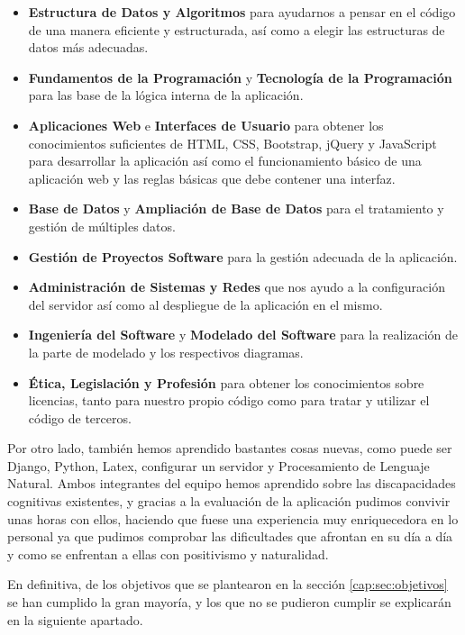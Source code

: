  	\begin{itemize}
 		\item \textbf{Estructura de Datos y Algoritmos }para ayudarnos a pensar en el código de una manera eficiente y estructurada, así como a elegir las estructuras de datos más adecuadas.
 		\item \textbf{Fundamentos de la Programación} y \textbf{Tecnología de la Programación} para las base de la lógica interna de la aplicación.
 		\item \textbf{Aplicaciones Web} e \textbf{Interfaces de Usuario} para obtener los conocimientos suficientes de HTML, CSS, Bootstrap, jQuery y JavaScript para desarrollar la aplicación así como el funcionamiento básico de una aplicación web y las reglas básicas que debe contener una interfaz.
 		\item \textbf{Base de Datos} y \textbf{Ampliación de Base de Datos} para el tratamiento y gestión de múltiples datos.
 		\item \textbf{Gestión de Proyectos Software} para la gestión adecuada de la aplicación.
 		\item \textbf{Administración de Sistemas y Redes} que nos ayudo a la configuración del servidor así como al despliegue de la aplicación en el mismo.
 		\item \textbf{Ingeniería del Software} y \textbf{Modelado del Software} para la realización de la parte de modelado y los respectivos diagramas.
 		\item \textbf{Ética, Legislación y Profesión} para obtener los conocimientos sobre licencias, tanto para nuestro propio código como para tratar y utilizar el código de terceros.
 	\end{itemize}

	Por otro lado, también hemos aprendido bastantes cosas nuevas, como puede ser Django, Python, Latex, configurar un servidor y Procesamiento de Lenguaje Natural. 
	Ambos integrantes del equipo hemos aprendido sobre las discapacidades cognitivas existentes, y gracias a la evaluación de la aplicación pudimos convivir unas horas con ellos, haciendo que fuese una experiencia muy enriquecedora en lo personal ya que pudimos comprobar las dificultades que afrontan en su día a día y como se enfrentan a ellas con positivismo y naturalidad.

	En definitiva, de los objetivos que se plantearon en la sección \ref{cap:sec:objetivos} se han cumplido la gran mayoría, y los que no se pudieron cumplir se explicarán en la siguiente apartado.
	
